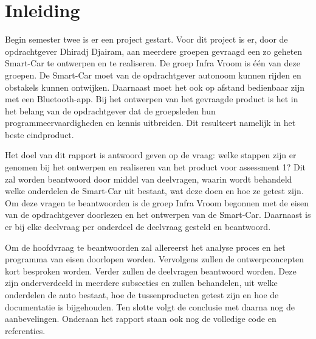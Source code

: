 \section{Inleiding}
Begin semester twee is er een project gestart. Voor dit project is er, door de opdrachtgever Dhiradj Djairam, aan meerdere groepen gevraagd een zo geheten \gls{Smart-Car} te ontwerpen en te realiseren. De groep Infra Vroom is één van deze groepen.
De \gls{Smart-Car} moet van de opdrachtgever autonoom kunnen rijden en obstakels kunnen ontwijken. Daarnaast moet het ook op afstand bedienbaar zijn met een \gls{Bluetooth}-app.
Bij het ontwerpen van het gevraagde product is het in het belang van de opdrachtgever dat de groepsleden hun programmeervaardigheden en kennis uitbreiden. Dit resulteert namelijk in het beste eindproduct. 

Het doel van dit rapport is antwoord geven op de vraag: welke stappen zijn er genomen bij het ontwerpen en realiseren van het product voor assessment 1? 
Dit zal worden beantwoord door middel van deelvragen, waarin wordt behandeld welke onderdelen de \gls{Smart-Car} uit bestaat, wat deze doen en hoe ze getest zijn. Om deze vragen te beantwoorden is de groep Infra Vroom begonnen met de eisen van de opdrachtgever doorlezen en het ontwerpen van de \gls{Smart-Car}. Daarnaast is er bij elke deelvraag per onderdeel de deelvraag gesteld en beantwoord. 

Om de hoofdvraag te beantwoorden zal allereerst het analyse proces en het programma van eisen doorlopen worden. Vervolgens zullen de ontwerpconcepten kort besproken worden. Verder zullen de deelvragen beantwoord worden. Deze zijn onderverdeeld in meerdere subsecties en zullen behandelen, uit welke onderdelen de auto bestaat, hoe de tussenproducten getest zijn en hoe de documentatie is bijgehouden. Ten slotte volgt de conclusie met daarna nog de aanbevelingen. Onderaan het rapport staan ook nog de volledige code en referenties.  
